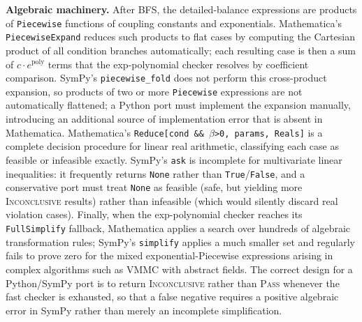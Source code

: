 \documentclass[twocolumn,10pt]{article}
\begin{document}
\medskip\noindent\textbf{Algebraic machinery.}
After BFS, the detailed-balance expressions are products of
\texttt{Piecewise} functions of coupling constants and exponentials.
Mathematica's \texttt{PiecewiseExpand} reduces such products to flat
cases by computing the Cartesian product of all condition branches
automatically; each resulting case is then a sum of $c\cdot e^{\text{poly}}$
terms that the exp-polynomial checker resolves by coefficient comparison.
SymPy's \texttt{piecewise\_fold} does not perform this cross-product
expansion, so products of two or more \texttt{Piecewise} expressions are
not automatically flattened; a Python port must implement the expansion
manually, introducing an additional source of implementation error that
is absent in Mathematica.  Mathematica's
\texttt{Reduce[cond\,\&\&\,$\beta$>0,\,params,\,Reals]} is a complete
decision procedure for linear real arithmetic, classifying each case
as feasible or infeasible exactly.  SymPy's \texttt{ask} is incomplete
for multivariate linear inequalities: it frequently returns
\texttt{None} rather than \texttt{True}/\texttt{False}, and a conservative
port must treat \texttt{None} as feasible (safe, but yielding more
\textsc{Inconclusive} results) rather than infeasible (which would
silently discard real violation cases).  Finally, when the
exp-polynomial checker reaches its \texttt{FullSimplify} fallback,
Mathematica applies a search over hundreds of algebraic transformation
rules; SymPy's \texttt{simplify} applies a much smaller set and
regularly fails to prove zero for the mixed exponential-Piecewise
expressions arising in complex algorithms such as VMMC with abstract
fields.  The correct design for a Python/SymPy port is to return
\textsc{Inconclusive} rather than \textsc{Pass} whenever the fast
checker is exhausted, so that a false negative requires a positive
algebraic error in SymPy rather than merely an incomplete simplification.
\end{document}
